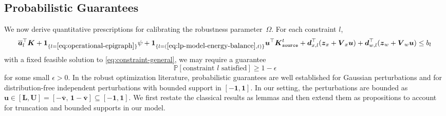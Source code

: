 \documentclass[11pt, letter]{article}
\begin{document}
\subsection{Probabilistic Guarantees}\label{app:prob-guarantee}
We now derive quantitative prescriptions for calibrating the robustness parameter~$\Omega$. For each constraint $l$,
\begin{equation}\label{eq:constraint-l}
\overline{\boldsymbol{a}}_l^\top \boldsymbol{K} 
+ \mathbf{1}_{\{l=\eqref{eq:operational-epigraph}\}} \psi 
+ \mathbf{1}_{\{l=(\eqref{eq:lp-model-energy-balance},t)\}} \boldsymbol{u}^\top \boldsymbol{K}_{\texttt{source}}^t 
+ \boldsymbol{d}_{x,l}^\top(\boldsymbol{z}_x + \boldsymbol{V}_x \boldsymbol{u}) 
+ \boldsymbol{d}_{w,l}^\top(\boldsymbol{z}_w + \boldsymbol{V}_w \boldsymbol{u}) 
\le b_l 
\end{equation}
with a fixed feasible solution to \eqref{eq:constraint-general}, we may require a guarantee
\begin{equation}\label{eq:prob-guarantee}
\mathbb{P}\left[\text{constraint $l$ satisfied}\right] \ge 1-\epsilon
\end{equation}
for some small $\epsilon > 0$.
In the robust optimization literature, probabilistic guarantees are well established for Gaussian perturbations and for distribution-free independent perturbations with bounded support in $[-\boldsymbol{1},\boldsymbol{1}]$. 
In our setting, the perturbations are bounded as 
$\boldsymbol{u}\in\boldsymbol{[L,U]}=[-\boldsymbol{\overline v},\,\boldsymbol{1}-\boldsymbol{\overline v}] 
\subseteq [-\boldsymbol{1},\boldsymbol{1}]$. 
We first restate the classical results as lemmas and then extend them as propositions to account for truncation and bounded supports in our model.
\end{document}
